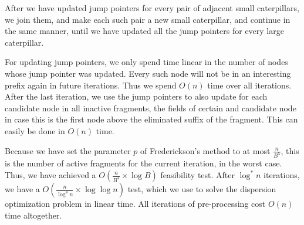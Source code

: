 \documentclass[11pt,a4paper]{article}
\theoremstyle{definition}
\theoremstyle{remark}
\begin{document}
After we have updated jump pointers for every pair of adjacent small caterpillars, we join them, and make each such pair a new small caterpillar, and continue in the same manner, until we have updated all the jump pointers for every large caterpillar.

For updating jump pointers, we only spend time linear in the number of nodes whose jump pointer was updated. Every such node will not be in an interesting prefix again in future iterations. Thus we spend $O(n)$ time over all iterations. After the last iteration, we use the jump pointers to also update for each candidate node in all inactive fragments, the fields of certain and candidate node in case this is the first node above the eliminated suffix of the fragment. This can easily be done in $O(n)$ time. %

Because we have set the parameter $p$ of Frederickson's method to at most $\frac{n}{B^5}$, this is the number of active fragments for the current iteration, in the worst case. Thus, we have achieved a $O(\frac{n}{B^4} \times \log B)$ feasibility test. After $\log ^*n$ iterations, we have a $O(\frac{n}{\log ^4n} \times \log \log n)$ test, which we use to solve the dispersion optimization problem in linear time. All iterations of pre-processing cost $O(n)$ time altogether.



\end{document}
